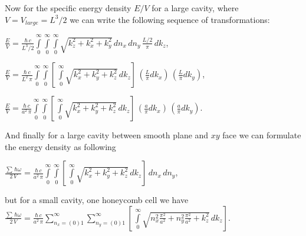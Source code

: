 \documentclass[twoside, 10pt]{article}
\begin{document}
\begin{multicols}{2}
    Now for the specific energy density \(E/V\) for a large cavity, where
\(V = V_{large} = L^3/2\) we can write the following sequence of transformations:

\noindent
    \(\frac{E}{V} = \frac{\hbar\,c}{L^3/2}\int\limits_{0}^{\infty}\int\limits_{0}^{\infty}\int\limits_{0}^{\infty}\sqrt{k_z^2+k_x^2+k_y^2}\,dn_x\,dn_y\,\frac{L/2}{\pi}\,dk_z\),


\noindent
    \(\frac{E}{V} = \frac{\hbar\,c}{L^2\,\pi}\int\limits_{0}^{\infty}\int\limits_{0}^{\infty}\left[\,\int\limits_{0}^{\infty}\sqrt{k_x^2+k_y^2+k_z^2}\,dk_z\right]\,\left(\frac{L}{\pi}dk_x\right)\,\left(\frac{L}{\pi}dk_y\right)\),

\noindent
    \(\frac{E}{V} = \frac{\hbar\,c}{a^2\,\pi}\int\limits_{0}^{\infty}\int\limits_{0}^{\infty}\left[\,\int\limits_{0}^{\infty}\sqrt{k_x^2+k_y^2+k_z^2}\,dk_z\right]\,\left(\frac{a}{\pi}dk_x\right)\,\left(\frac{a}{\pi}dk_y\right)\).

And finally for a large cavity between smooth plane and \(xy\) face we can formulate the energy density as following

    \(\frac{\sum\,\hbar\omega}{2\,V} = \frac{\hbar\,c}{a^2\,\pi}\int\limits_{0}^{\infty}\int\limits_{0}^{\infty}\left[\,\int\limits_{0}^{\infty}\sqrt{k_x^2+k_y^2+k_z^2}\,dk_z\right]\,dn_x\,dn_y\),

but for a small cavity, one honeycomb cell we have
\noindent
    \(\frac{\sum\,\hbar\omega}{2\,V} = \frac{\hbar\,c}{a^2\,\pi}\sum\limits_{n_x=(0)1}^{\infty}\sum\limits_{n_y=(0)1}^{\infty}\left[\,\int\limits_{0}^{\infty}\sqrt{n_x^2\frac{\pi^2}{a^2}+n_y^2\frac{\pi^2}{a^2}+k_z^2}\,dk_z\right]\).




\end{multicols}
\end{document}
